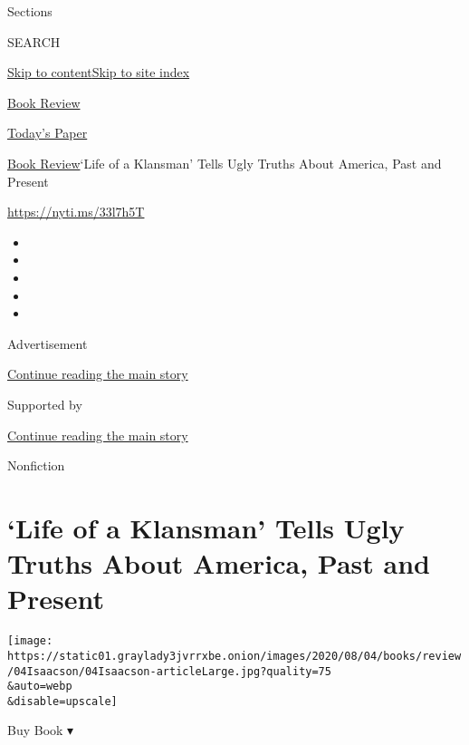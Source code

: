 Sections

SEARCH

\protect\hyperlink{site-content}{Skip to
content}\protect\hyperlink{site-index}{Skip to site index}

\href{https://www.nytimes3xbfgragh.onion/section/books/review}{Book
Review}

\href{https://myaccount.nytimes3xbfgragh.onion/auth/login?response_type=cookie\&client_id=vi}{}

\href{https://www.nytimes3xbfgragh.onion/section/todayspaper}{Today's
Paper}

\href{/section/books/review}{Book Review}\textbar{}`Life of a Klansman'
Tells Ugly Truths About America, Past and Present

\url{https://nyti.ms/33l7h5T}

\begin{itemize}
\item
\item
\item
\item
\item
\end{itemize}

Advertisement

\protect\hyperlink{after-top}{Continue reading the main story}

Supported by

\protect\hyperlink{after-sponsor}{Continue reading the main story}

Nonfiction

\hypertarget{life-of-a-klansman-tells-ugly-truths-about-america-past-and-present}{%
\section{`Life of a Klansman' Tells Ugly Truths About America, Past and
Present}\label{life-of-a-klansman-tells-ugly-truths-about-america-past-and-present}}

\texttt{[image: https://static01.graylady3jvrrxbe.onion/images/2020/08/04/books/review/04Isaacson/04Isaacson-articleLarge.jpg?quality=75\\\&auto=webp\\\&disable=upscale]}

Buy Book ▾

